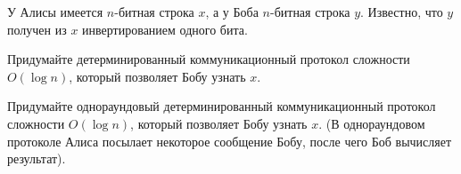 У Алисы имеется $n$-битная строка $x$, а у Боба $n$-битная строка $y$.
Известно, что $y$ получен из $x$ инвертированием одного бита.
\begin{enumcyr}
    \item Придумайте детерминированный коммуникационный протокол сложности $O(\log n)$, который позволяет
        Бобу узнать $x$.
    \item Придумайте однораундовый детерминированный коммуникационный протокол сложности $O(\log n)$,
        который позволяет Бобу узнать $x$. (В однораундовом протоколе Алиса посылает некоторое сообщение
        Бобу, после чего Боб вычисляет результат).
\end{enumcyr}
